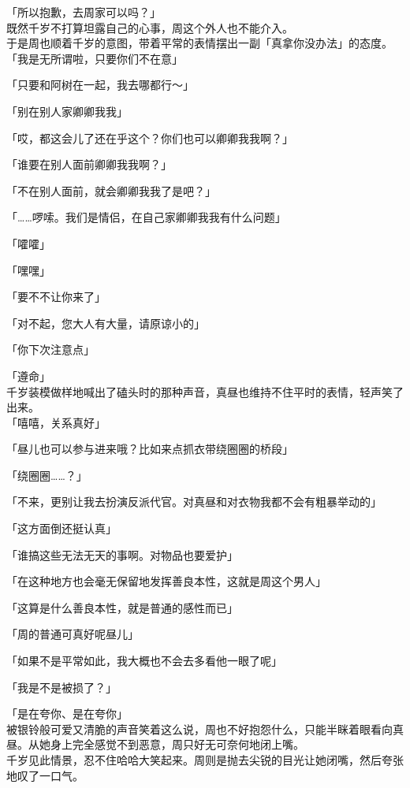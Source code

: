 「所以抱歉，去周家可以吗？」\\

既然千岁不打算坦露自己的心事，周这个外人也不能介入。\\

于是周也顺着千岁的意图，带着平常的表情摆出一副「真拿你没办法」的态度。\\

「我是无所谓啦，只要你们不在意」

「只要和阿树在一起，我去哪都行～」

「别在别人家卿卿我我」

「哎，都这会儿了还在乎这个？你们也可以卿卿我我啊？」

「谁要在别人面前卿卿我我啊？」

「不在别人面前，就会卿卿我我了是吧？」

「……啰嗦。我们是情侣，在自己家卿卿我我有什么问题」

「嚯嚯」

「嘿嘿」

「要不不让你来了」

「对不起，您大人有大量，请原谅小的」

「你下次注意点」

「遵命」\\

千岁装模做样地喊出了磕头时的那种声音，真昼也维持不住平时的表情，轻声笑了出来。\\

「嘻嘻，关系真好」

「昼儿也可以参与进来哦？比如来点抓衣带绕圈圈的桥段」

「绕圈圈……？」

「不来，更别让我去扮演反派代官。对真昼和对衣物我都不会有粗暴举动的」

「这方面倒还挺认真」

「谁搞这些无法无天的事啊。对物品也要爱护」

「在这种地方也会毫无保留地发挥善良本性，这就是周这个男人」

「这算是什么善良本性，就是普通的感性而已」

「周的普通可真好呢昼儿」

「如果不是平常如此，我大概也不会去多看他一眼了呢」

「我是不是被损了？」

「是在夸你、是在夸你」\\

被银铃般可爱又清脆的声音笑着这么说，周也不好抱怨什么，只能半眯着眼看向真昼。从她身上完全感觉不到恶意，周只好无可奈何地闭上嘴。\\

千岁见此情景，忍不住哈哈大笑起来。周则是抛去尖锐的目光让她闭嘴，然后夸张地叹了一口气。
